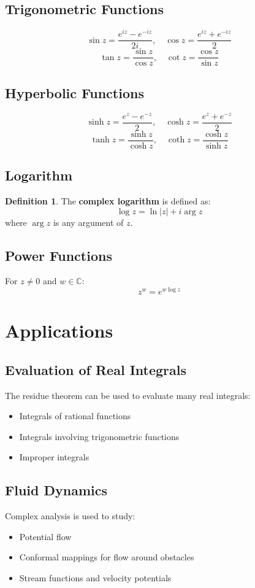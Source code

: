 \documentclass[11pt]{article}
\theoremstyle{definition}
\newtheorem{definition}{Definition}[section]
\begin{document}
\subsection{Trigonometric Functions}
$$\sin z = \frac{e^{iz} - e^{-iz}}{2i}, \quad \cos z = \frac{e^{iz} + e^{-iz}}{2}$$
$$\tan z = \frac{\sin z}{\cos z}, \quad \cot z = \frac{\cos z}{\sin z}$$

\subsection{Hyperbolic Functions}
$$\sinh z = \frac{e^z - e^{-z}}{2}, \quad \cosh z = \frac{e^z + e^{-z}}{2}$$
$$\tanh z = \frac{\sinh z}{\cosh z}, \quad \coth z = \frac{\cosh z}{\sinh z}$$

\subsection{Logarithm}
\begin{definition}
The \textbf{complex logarithm} is defined as:
$$\log z = \ln|z| + i \arg z$$
where $\arg z$ is any argument of $z$.
\end{definition}

\subsection{Power Functions}
For $z \neq 0$ and $w \in \mathbb{C}$:
$$z^w = e^{w \log z}$$

\section{Applications}

\subsection{Evaluation of Real Integrals}
The residue theorem can be used to evaluate many real integrals:
\begin{itemize}
    \item Integrals of rational functions
    \item Integrals involving trigonometric functions
    \item Improper integrals
\end{itemize}

\subsection{Fluid Dynamics}
Complex analysis is used to study:
\begin{itemize}
    \item Potential flow
    \item Conformal mappings for flow around obstacles
    \item Stream functions and velocity potentials
\end{itemize}
\end{document}
